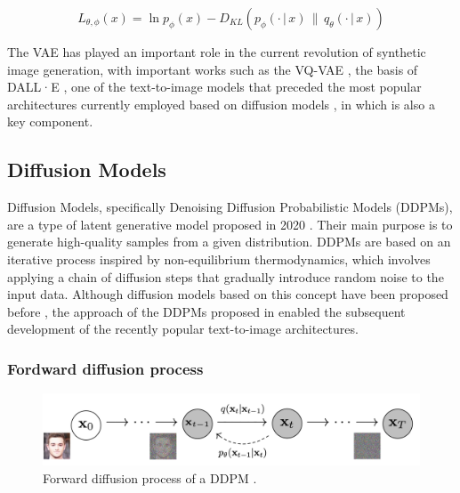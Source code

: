 \begin{equation}
    L_{\theta, \phi} (x) = \ln p_\phi (x) - D_{KL} (p_\phi(\cdot \, | \, x)\, \| \, q_\theta (\cdot \, | \, x)  )
\end{equation}


The VAE has played an important role in the current revolution of synthetic image generation, with important works such as the VQ-VAE \cite{NIPS2017_7a98af17}, the basis of DALL·E \cite{dalle1}, one of the text-to-image models that preceded the most popular architectures currently employed based on diffusion models \cite{Dalle2, rombach2022high}, in which is also a key component.

\subsection{Diffusion Models}
\label{sec:diffusion-models}

Diffusion Models, specifically Denoising Diffusion Probabilistic Models (DDPMs), are a type of latent generative model proposed in 2020 \cite{HoEtAl2020}. Their main purpose is to generate high-quality samples from a given distribution. DDPMs are based on an iterative process inspired by non-equilibrium thermodynamics, which involves applying a chain of diffusion steps that gradually introduce random noise to the input data. Although diffusion models based on this concept have been proposed before \cite{pmlr-v37-sohl-dickstein15}, the approach of the DDPMs proposed in \cite{HoEtAl2020} enabled the subsequent development of the recently popular text-to-image architectures.


\subsubsection{Fordward diffusion process}

\begin{figure}
    \centering
    \includegraphics[width=1\columnwidth]{img/2-related-work/fordward-proccess.png}
    \caption[Forward diffusion process of a DDPM]{Forward diffusion process of a DDPM \cite{HoEtAl2020}.}
    \label{fig:fodward-diffusion-process}
\end{figure}


